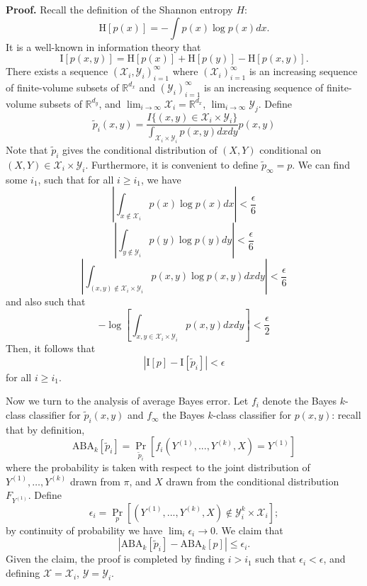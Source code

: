\textbf{Proof.}
Recall the definition of the Shannon entropy $H$:
\[
\text{H}[p(x)] = - \int p(x) \log p(x) dx.
\]
It is a well-known in information theory that
\[
\text{I}[p(x, y)] = \text{H}[p(x)] + \text{H}[p(y)] - \text{H}[p(x, y)].
\]
There exists a sequence $(\mathcal{X}_i, \mathcal{Y}_i)_{i=1}^\infty$
where $(\mathcal{X}_i)_{i=1}^\infty$ is an increasing sequence of finite-volume subsets of $\mathbb{R}^{d_x}$
and $(\mathcal{Y}_i)_{i=1}^\infty$ is an increasing sequence of finite-volume subsets of $\mathbb{R}^{d_y}$,
and $\lim_{i \to \infty} \mathcal{X}_i = \mathbb{R}^{d_x}$, $\lim_{i \to \infty} \mathcal{Y}_j$.
Define
\[
\tilde{p}_i(x, y) = \frac{I\{(x,y) \in \mathcal{X}_i\times \mathcal{Y}_i\} }{\int_{\mathcal{X}_i \times \mathcal{Y}_i} p(x,y) dx dy} p(x,y)
\]
Note that $\tilde{p}_i$ gives the conditional distribution of $(X, Y)$
conditional on $(X, Y) \in \mathcal{X}_i \times \mathcal{Y}_i$. 
Furthermore, it is convenient to define $\tilde{p}_\infty = p$.
We can find some $i_1$, such that for all $i \geq i_1$, we have
\[
\left|\int_{x \notin \mathcal{X}_i} p(x) \log p(x) dx\right| < \frac{\epsilon}{6}
\]
\[
\left|\int_{y \notin \mathcal{Y}_i} p(y) \log p(y) dy\right| < \frac{\epsilon}{6}
\]
\[
\left|\int_{(x,y) \notin \mathcal{X}_i \times \mathcal{Y}_i} p(x, y) \log p(x, y) dx dy\right| < \frac{\epsilon}{6}
\]
and also such that
\[
-\log \left[\int_{x, y \in \mathcal{X}_i \times \mathcal{Y}_i} p(x, y) dx dy\right] < \frac{\epsilon}{2}
\]
Then, it follows that
\[
|\text{I}[p] - \text{I}[\tilde{p}_i]| < \epsilon
\]
for all $i \geq i_1$.

Now we turn to the analysis of average Bayes error.
Let $f_i$ denote the Bayes $k$-class classifier for $\tilde{p}_i(x, y)$
and
$f_\infty$ the Bayes $k$-class classifier for $p(x, y)$: recall that by definition,
\[
\text{ABA}_k[\tilde{p}_i] = \Pr_{\tilde{p}_i}[f_i(Y^{(1)},...,Y^{(k)}, X) = Y^{(1)}]
\]
where the probability is taken with respect to the joint distribution
of $Y^{(1)},\hdots, Y^{(k)}$ drawn from $\pi$, and $X$ drawn from the
conditional distribution $F_{Y^{(1)}}.$
Define
\[
\epsilon_i = \Pr_p[(Y^{(1)},...,Y^{(k)}, X)\notin \mathcal{Y}_i^k \times \mathcal{X}_i ];
\]
by continuity of probability we have $\lim_i \epsilon_i \to 0$.
We claim that
\[
|\text{ABA}_k[\tilde{p}_i] - \text{ABA}_k[p]| \leq \epsilon_i.
\]
Given the claim, the proof is completed by finding $i > i_1$ such that $\epsilon_i < \epsilon$,
and defining $\mathcal{X} = \mathcal{X}_i$, $\mathcal{Y} = \mathcal{Y}_i$.

